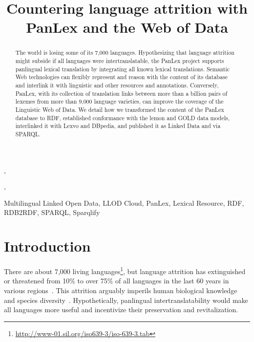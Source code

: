 \documentclass[sw]{iosart2c}
\begin{document}
\begin{frontmatter} 
\title{Countering language attrition with PanLex and the Web of Data}


\author[A]{ },
\author[A]{ },
\author[B]{ }
\address[A]{University of Leipzig, \{pwestphal, cstadler\}@informatik.uni-leipzig.de}
\address[B]{The Long Now Foundation, San Francisco, pool@panlex.org}


\begin{abstract}
The world is losing some of its 7,000 languages.
Hypothesizing that language attrition might subside if all languages were inter\-trans\-latable, the PanLex project supports panlingual lexical translation by integrating all known lexical translations.
Semantic Web technologies can flexibly represent and reason with the content of its database and interlink it with linguistic and other resources and annotations.
Conversely, PanLex, with its collection of translation links between more than a billion pairs of lexemes from more than 9,000 language varieties, can improve the coverage of the Linguistic Web of Data.
We detail how we transformed the content of the PanLex database to RDF, established conformance with the lemon and GOLD data models,
interlinked it with Lexvo and DBpedia, and published it as Linked Data and via SPARQL.
\end{abstract}

\begin{keyword}
Multilingual Linked Open Data, LLOD Cloud, PanLex, Lexical Resource, RDF, RDB2RDF, SPARQL, Sparqlify
\end{keyword}
\end{frontmatter}

\section{Introduction}
\label{sec:intro}
There are about 7,000 living languages\footnote{\url{http://www-01.sil.org/iso639-3/iso-639-3.tab}}, but language attrition has extinguished or threatened from 10\% to over 75\% of all languages in the last 60 years in various regions~\cite{lang_crisis}.
This attrition arguably imperils human biological knowledge and species diversity~\cite{nettle}. Hypothetically, panlingual intertranslatability would make all languages more useful and incentivize their preservation and revitalization. 
\end{document}
